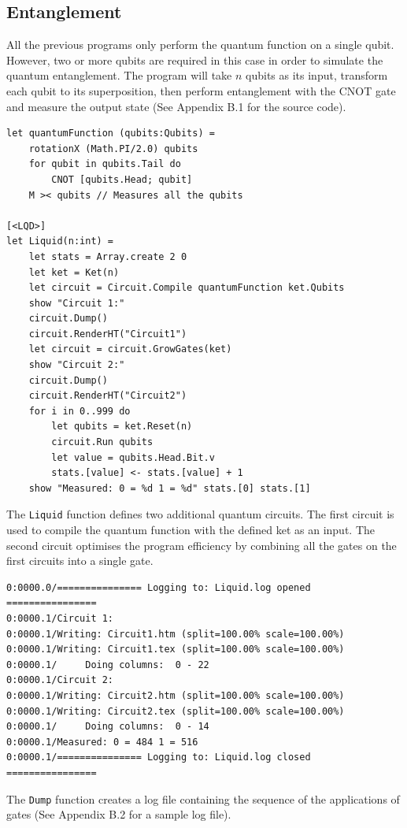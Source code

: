 \documentclass[12pt]{third-rep}
\begin{document}
\subsection{Entanglement}
All the previous programs only perform the quantum function on a single qubit. However, two or more qubits are required in this case in order to simulate the quantum entanglement. The program will take $n$ qubits as its input, transform each qubit to its superposition, then perform entanglement with the CNOT gate and measure the output state (See Appendix B.1 for the source code).
\begin{verbatim}
let quantumFunction (qubits:Qubits) =
    rotationX (Math.PI/2.0) qubits
    for qubit in qubits.Tail do 
        CNOT [qubits.Head; qubit]
    M >< qubits // Measures all the qubits

[<LQD>]
let Liquid(n:int) =
    let stats = Array.create 2 0
    let ket = Ket(n)
    let circuit = Circuit.Compile quantumFunction ket.Qubits
    show "Circuit 1:"
    circuit.Dump()
    circuit.RenderHT("Circuit1")
    let circuit = circuit.GrowGates(ket)
    show "Circuit 2:"
    circuit.Dump()
    circuit.RenderHT("Circuit2")
    for i in 0..999 do
        let qubits = ket.Reset(n) 
        circuit.Run qubits
        let value = qubits.Head.Bit.v
        stats.[value] <- stats.[value] + 1
    show "Measured: 0 = %d 1 = %d" stats.[0] stats.[1]
\end{verbatim}
The \texttt{Liquid} function defines two additional quantum circuits. The first circuit is used to compile the quantum function with the defined ket as an input. The second circuit optimises the program efficiency by combining all the gates on the first circuits into a single gate.
\begin{verbatim}
0:0000.0/=============== Logging to: Liquid.log opened ================
0:0000.1/Circuit 1:
0:0000.1/Writing: Circuit1.htm (split=100.00% scale=100.00%)
0:0000.1/Writing: Circuit1.tex (split=100.00% scale=100.00%)
0:0000.1/     Doing columns:  0 - 22
0:0000.1/Circuit 2:
0:0000.1/Writing: Circuit2.htm (split=100.00% scale=100.00%)
0:0000.1/Writing: Circuit2.tex (split=100.00% scale=100.00%)
0:0000.1/     Doing columns:  0 - 14
0:0000.1/Measured: 0 = 484 1 = 516
0:0000.1/=============== Logging to: Liquid.log closed ================
\end{verbatim}
The \texttt{Dump} function creates a log file containing the sequence of the applications of gates (See Appendix B.2 for a sample log file). \\\\
\end{document}
